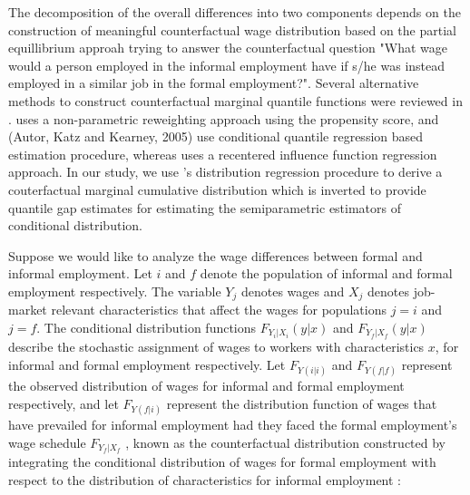 The decomposition of the overall differences into two components depends on the construction of meaningful counterfactual wage distribution based on the partial equillibrium approah trying to answer the counterfactual question "What wage would a person employed in the informal employment have if s/he was instead employed in a similar job in the formal employment?".  %
Several alternative methods to construct counterfactual marginal quantile functions were reviewed in \textcite{Fortin2011}. \textcite{DiNardo1996} uses a non-parametric reweighting approach using the propensity score, \textcite{Machado2005} and (Autor, Katz and Kearney, 2005) use conditional quantile regression based estimation procedure, whereas \textcite{Firpo2009} uses a recentered influence function regression approach. In our study, we use  \textcite{Chernozhukov2013}'s distribution regression procedure to derive a couterfactual marginal cumulative distribution which is inverted to provide quantile gap estimates for estimating the semiparametric estimators of conditional distribution.  

Suppose we would like to analyze the wage differences between formal and informal employment. Let $i$ and $f$ denote the population of informal and formal employment respectively. The variable $Y_j$ denotes wages and $X_j$ denotes job-market relevant characteristics that affect the wages for populations $j = i$ and $j = f$. The conditional distribution functions $F_{Y_i|X_i} (y|x)$ and $F_{Y_f|X_f} (y|x)$ describe the stochastic assignment of wages to workers with characteristics $x$, for informal and formal employment respectively.  Let  $F_{Y(i|i)}$ and $F_{Y(f|f)}$ represent the observed distribution of wages for informal and formal employment respectively, and let $F_{Y({f|i})}$ represent the distribution function of wages that have prevailed for informal employment had they faced the formal employment's wage schedule $F_{Y_f|X_f}$ , known as the counterfactual distribution constructed by integrating the conditional distribution of wages for formal employment with respect to the distribution of characteristics for informal employment : 

